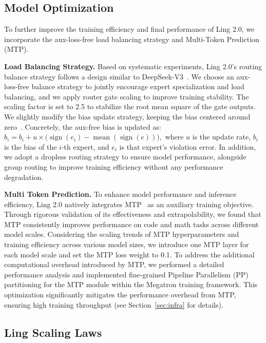 \documentclass[table]{gtech}
\theoremstyle{definition}
\newcommand{\paratitle}[1]{\vspace{1.5ex}\noindent\textbf{#1}}
\begin{document}
\subsection{Model Optimization}
To further improve the training efficiency and final performance of Ling 2.0, we incorporate the aux-loss-free load balancing strategy and Multi-Token Prediction (MTP).

\paratitle{Load Balancing Strategy. }
\label{sec:load_balance}
Based on systematic experiments, Ling 2.0's routing balance strategy follows a design similar to DeepSeek-V3~\citep{deepseekai2024deepseekv3technicalreport}. We choose an aux-loss-free balance strategy to jointly encourage expert specialization and load balancing, and we apply router gate scaling to improve training stability. The scaling factor is set to 2.5 to stabilize the root mean square of the gate outputs. We slightly modify the bias update strategy, keeping the bias centered around zero~\citep{liu2025muon}. Concretely, the aux-free bias is updated as:
$b_i = b_i + u \times \bigl(\operatorname{sign}(e_i) - \operatorname{mean}(\operatorname{sign}(e))\bigr),$
where $u$ is the update rate, $b_i$ is the bias of the $i$-th expert, and $e_i$ is that expert's violation error.
In addition, we adopt a dropless routing strategy to ensure model performance, alongside group routing to improve training efficiency without any performance degradation.

\paratitle{Multi Token Prediction. }
\label{sec:mtp}
To enhance model performance and inference efficiency, Ling 2.0 natively integrates MTP~\citep{gloeckle2024better,deepseekai2024deepseekv3technicalreport}  as an auxiliary training objective. Through rigorous validation of its effectiveness and extrapolability, we found that MTP consistently improves performance on code and math tasks across different model scales. Considering the scaling trends of MTP hyperparameters and training efficiency across various model sizes, we introduce one MTP layer for each model scale and set the MTP loss weight to 0.1. 
To address the additional computational overhead introduced by MTP, we performed a detailed performance analysis and implemented fine-grained Pipeline Parallelism (PP) partitioning for the MTP module within the Megatron training framework. This optimization significantly mitigates the performance overhead from MTP, ensuring high training throughput (see Section~\ref{sec:infra} for details).

\subsection{Ling Scaling Laws}
\label{sec:scaling_law}
\end{document}
